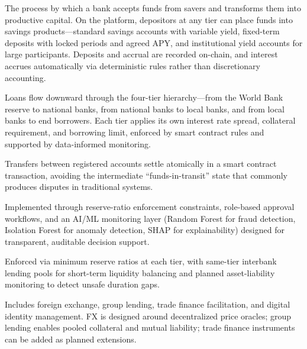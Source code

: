 \documentclass[12pt,a4paper]{report}
\begin{document}
\begin{description}[leftmargin=0pt]
\item[\textbf{Deposit Mobilization.}] The process by which a bank accepts funds from savers and transforms them into productive capital. On the platform, depositors at any tier can place funds into savings products---standard savings accounts with variable yield, fixed-term deposits with locked periods and agreed APY, and institutional yield accounts for large participants. Deposits and accrual are recorded on-chain, and interest accrues automatically via deterministic rules rather than discretionary accounting.
\item[\textbf{Credit Allocation.}] Loans flow downward through the four-tier hierarchy---from the World Bank reserve to national banks, from national banks to local banks, and from local banks to end borrowers. Each tier applies its own interest rate spread, collateral requirement, and borrowing limit, enforced by smart contract rules and supported by data-informed monitoring.
\item[\textbf{Payment and Settlement.}] Transfers between registered accounts settle atomically in a smart contract transaction, avoiding the intermediate ``funds-in-transit'' state that commonly produces disputes in traditional systems.
\item[\textbf{Risk Intermediation.}] Implemented through reserve-ratio enforcement constraints, role-based approval workflows, and an AI/ML monitoring layer (Random Forest for fraud detection, Isolation Forest for anomaly detection, SHAP for explainability) designed for transparent, auditable decision support.
\item[\textbf{Liquidity Management.}] Enforced via minimum reserve ratios at each tier, with same-tier interbank lending pools for short-term liquidity balancing and planned asset-liability monitoring to detect unsafe duration gaps.
\item[\textbf{Ancillary Financial Services.}] Includes foreign exchange, group lending, trade finance facilitation, and digital identity management. FX is designed around decentralized price oracles; group lending enables pooled collateral and mutual liability; trade finance instruments can be added as planned extensions.
\end{description}
\end{document}
